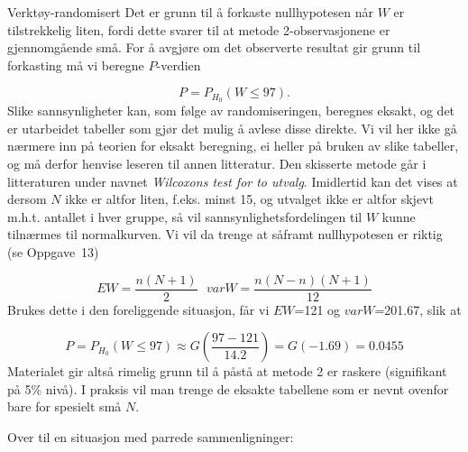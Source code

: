 \begin{eksempel}{Verktøy-randomisert}
Det er grunn til å forkaste nullhypotesen når $W$ er
tilstrekkelig liten, fordi dette svarer til at metode 2-observasjonene
er gjennomgående små.  For å avgjøre om det observerte
resultat gir grunn til forkasting må vi beregne $P$-verdien

\[ P=P_{H_0}(W\leq 97).         \]
Slike sannsynligheter kan, som følge av randomiseringen, beregnes
eksakt, og det er utarbeidet tabeller som gjør det mulig å
avlese disse direkte.  Vi vil her ikke gå nærmere inn på
teorien for eksakt beregning, ei heller på bruken av slike tabeller,
og må derfor henvise leseren til annen litteratur.  Den skisserte
metode går i litteraturen under navnet {\em Wilcoxons test for 
to utvalg}.  Imidlertid kan det vises at dersom $N$ ikke er altfor liten,
f.eks. minst 15, og utvalget ikke er altfor skjevt m.h.t. antallet i
hver gruppe, så vil sannsynlighetsfordelingen til $W$ kunne 
tilnærmes til normalkurven.  Vi vil da trenge at såframt 
nullhypotesen er riktig (se Oppgave~13)

\[ EW=\frac{n(N+1)}{2} \mbox{\ \ \ } varW=\frac{n(N-n)(N+1)}{12}    \]
Brukes dette i den foreliggende situasjon, får vi $EW$=121 og 
$varW$=201.67, slik at 

\[  P=P_{H_0}(W\leq 97)\approx G(\frac{97-121}{14.2})=G(-1.69)=0.0455  \]
Materialet gir altså rimelig grunn til å påstå at 
metode 2 er raskere (signifikant på 5\% nivå).  I praksis vil
man trenge de eksakte tabellene som er nevnt ovenfor bare for 
spesielt små $N$. \\
\end{eksempel}
Over til en situasjon med parrede sammenligninger:\\

